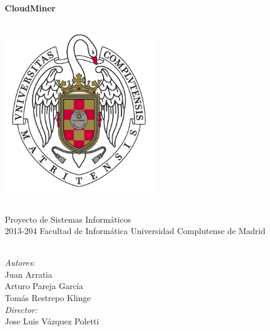 \begin{titlepage}
\begin{center}




\HRule \\[0.4cm]
{ \huge \bfseries CloudMiner \\[0.4cm] }

\HRule \\[1.2cm]

\includegraphics[width=0.5\textwidth]{./logoucm}

~\\

\Large Proyecto de Sistemas Inform\'aticos\\
\Large 2013-204
\Large Facultad de Inform\'atica
\Large Universidad Complutense de Madrid

~\\

\emph{Autores:}\\
Juan Arratia \\ Arturo Pareja Garc\'ia \\ Tom\'as Restrepo Klinge \\[1.0cm]
\emph{Director:} \\
Jose Luis V\'azquez Poletti

\vfill


\end{center}
\end{titlepage}